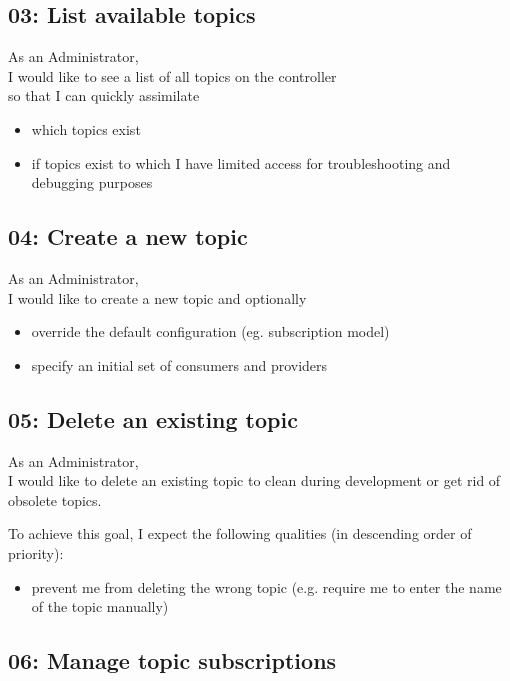 \subsection{03: List available topics}

As an Administrator,\\
I would like to see a list of all topics on the controller\\
so that I can quickly assimilate \\
\begin{itemize}
    \item which topics exist
    \item if topics exist to which I have limited access for troubleshooting and debugging purposes
\end{itemize}

\subsection{04: Create a new topic}

As an Administrator,\\
I would like to create a new topic and optionally

\begin{itemize} %
    \item override the default configuration (eg. subscription model) 
    \item specify an initial set of consumers and providers
\end{itemize}

\subsection{05: Delete an existing topic}

As an Administrator,\\
I would like to delete an existing topic
to clean during development or get rid of obsolete topics.

To achieve this goal, I expect the following qualities (in descending order of priority):
\begin{itemize}
    \item prevent me from deleting the wrong topic (e.g. require me to enter the name of the topic manually)
\end{itemize}


\subsection{06: Manage topic subscriptions}

